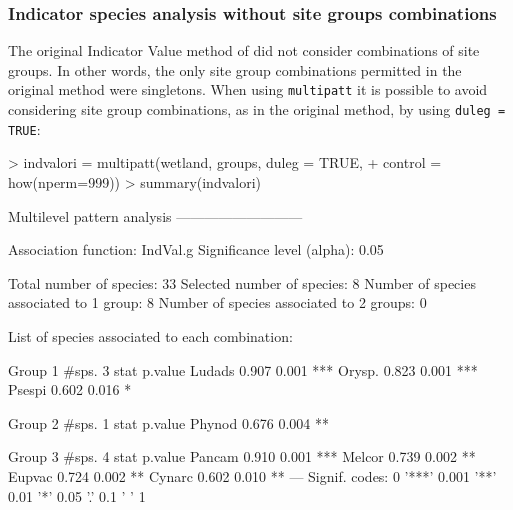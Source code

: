 \documentclass[11pt,a4paper]{article}
\begin{document}
\subsubsection{Indicator species analysis without site groups combinations}
The original Indicator Value method of \citet{Dufrene1997} did not consider combinations of site groups. In other words, the only site group combinations permitted in the original method were singletons. When using \texttt{multipatt} it is possible to avoid considering site group combinations, as in the original method, by using \texttt{duleg = TRUE}:
\begin{Schunk}
\begin{Sinput}
> indvalori = multipatt(wetland, groups, duleg = TRUE, 
+                       control = how(nperm=999)) 
> summary(indvalori)
\end{Sinput}
\begin{Soutput}
 Multilevel pattern analysis
 ---------------------------

 Association function: IndVal.g
 Significance level (alpha): 0.05

 Total number of species: 33
 Selected number of species: 8 
 Number of species associated to 1 group: 8 
 Number of species associated to 2 groups: 0 

 List of species associated to each combination: 

 Group 1  #sps.  3 
        stat p.value    
Ludads 0.907   0.001 ***
Orysp. 0.823   0.001 ***
Psespi 0.602   0.016 *  

 Group 2  #sps.  1 
        stat p.value   
Phynod 0.676   0.004 **

 Group 3  #sps.  4 
        stat p.value    
Pancam 0.910   0.001 ***
Melcor 0.739   0.002 ** 
Eupvac 0.724   0.002 ** 
Cynarc 0.602   0.010 ** 
---
Signif. codes:  0 '***' 0.001 '**' 0.01 '*' 0.05 '.' 0.1 ' ' 1 
\end{Soutput}
\end{Schunk}
\end{document}
